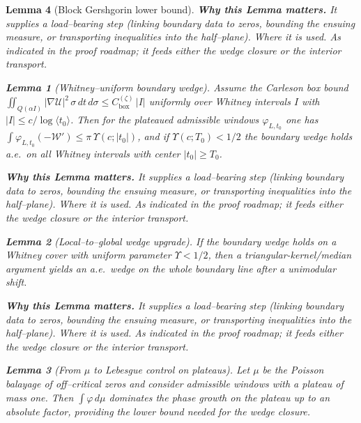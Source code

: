 \documentclass[11pt]{article}
\newtheorem{lemma}{Lemma}[section]
\theoremstyle{definition}
\theoremstyle{remark}
\providecommand{\Cbox}{C^{(\zeta)}_{\mathrm{box}}}
\begin{document}
\begin{lemma}[Block Gershgorin lower bound]
\noindent\textbf{Why this Lemma matters.} It supplies a load--bearing step (linking boundary data to zeros, bounding the ensuing measure, or transporting inequalities into the half--plane).
\noindent\textit{Where it is used.} As indicated in the proof roadmap; it feeds either the wedge closure or the interior transport.
\begin{lemma}[Whitney--uniform boundary wedge]\label{lem:whitney-uniform-wedge}
Assume the Carleson box bound $\iint_{Q(\alpha I)} |\nabla \mathcal U|^2\,\sigma\,dt\,d\sigma \le \Cbox\,|I|$ uniformly over Whitney intervals $I$ with $|I|\le c/\log\langle t_0\rangle$.
Then for the plateaued admissible windows $\varphi_{L,t_0}$ one has $\int \varphi_{L,t_0}(-\mathcal W')\le \pi\,\Upsilon(c;|t_0|)$, and if $\Upsilon(c;T_0)<1/2$ the boundary wedge holds a.e.\ on all Whitney intervals with center $|t_0|\ge T_0$.
\end{lemma}

\noindent\textbf{Why this Lemma matters.} It supplies a load--bearing step (linking boundary data to zeros, bounding the ensuing measure, or transporting inequalities into the half--plane).
\noindent\textit{Where it is used.} As indicated in the proof roadmap; it feeds either the wedge closure or the interior transport.
\begin{lemma}[Local--to--global wedge upgrade]\label{lem:local-to-global-wedge}
If the boundary wedge holds on a Whitney cover with uniform parameter $\Upsilon<1/2$, then a triangular-kernel/median argument yields an a.e.\ wedge on the whole boundary line after a unimodular shift.
\end{lemma}

\noindent\textbf{Why this Lemma matters.} It supplies a load--bearing step (linking boundary data to zeros, bounding the ensuing measure, or transporting inequalities into the half--plane).
\noindent\textit{Where it is used.} As indicated in the proof roadmap; it feeds either the wedge closure or the interior transport.
\begin{lemma}[From $\mu$ to Lebesgue control on plateaus]\label{lem:mu-to-lebesgue}
Let $\mu$ be the Poisson balayage of off--critical zeros and consider admissible windows with a plateau of mass one. Then $\int \varphi\,d\mu$ dominates the phase growth on the plateau up to an absolute factor, providing the lower bound needed for the wedge closure.
\end{lemma}


\end{lemma}
\end{document}
